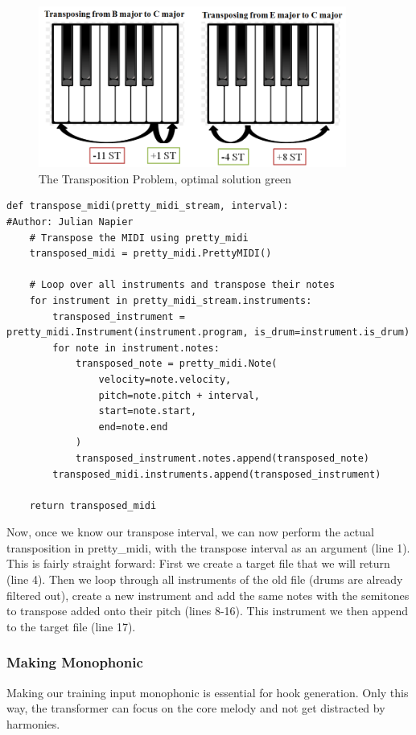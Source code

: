 \documentclass[a4paper,12pt]{extarticle}
\begin{document}
\begin{figure}[H] %
    \centering
    \includegraphics[width=0.9\textwidth]{transposing2.png} %
    \caption{The Transposition Problem, optimal solution green}
    \label{fig:transp}
\end{figure}

\begin{lstlisting}
def transpose_midi(pretty_midi_stream, interval):
#Author: Julian Napier
    # Transpose the MIDI using pretty_midi
    transposed_midi = pretty_midi.PrettyMIDI()

    # Loop over all instruments and transpose their notes
    for instrument in pretty_midi_stream.instruments:
        transposed_instrument = pretty_midi.Instrument(instrument.program, is_drum=instrument.is_drum)
        for note in instrument.notes:
            transposed_note = pretty_midi.Note(
                velocity=note.velocity,
                pitch=note.pitch + interval,
                start=note.start,
                end=note.end
            )
            transposed_instrument.notes.append(transposed_note)
        transposed_midi.instruments.append(transposed_instrument)

    return transposed_midi
\end{lstlisting} 
Now, once we know our transpose interval, we can now perform the actual transposition in pretty\_midi, with the transpose interval as an argument (line 1). This is fairly straight forward: First we create a target file that we will return (line 4). Then we loop through all instruments of the old file (drums are already filtered out), create a new instrument and add the same notes with the semitones to transpose added onto their pitch (lines 8-16). This instrument we then append to the target file (line 17).

\subsubsection{Making Monophonic}
Making our training input monophonic is essential for hook generation. Only this way, the transformer can focus on the core melody and not get distracted by harmonies. \newline
\end{document}
